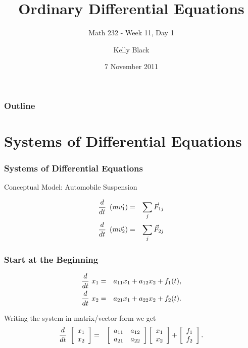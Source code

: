 
\title{Ordinary Differential Equations}
\subtitle{Math 232 - Week 11, Day 1}

\author{Kelly Black}
\date{7 November 2011}

\begin{frame}
  \titlepage
\end{frame}

\begin{frame}
  \frametitle{Outline}
\end{frame}


\section{Systems of Differential Equations}


\begin{frame}
  \frametitle{Systems of Differential Equations}

  Conceptual Model: Automobile Suspension

  \begin{eqnarray*}
    \deriv{~}{t} \lp m \vec{v_1} \rp & = & \sum_j \vec{F}_{1j} \\
    \deriv{~}{t} \lp m \vec{v_2} \rp & = & \sum_j \vec{F}_{2j} 
  \end{eqnarray*}

\end{frame}


\begin{frame}
  \frametitle{Start at the Beginning}

  \begin{eqnarray*}
    \deriv{~}{t} x_1  & = & a_{11} x_1 + a_{12} x_2 + f_1(t), \\
    \deriv{~}{t} x_2  & = & a_{21} x_1 + a_{22} x_2 + f_2(t).
  \end{eqnarray*}

  Writing the system in matrix/vector form we get
  \begin{eqnarray*}
    \deriv{~}{t} \vecTwo{x_1}{x_2} & = & 
    \arrayTwo{a_{11}}{a_{12}}{a_{21}}{a_{22}} \vecTwo{x_1}{x_2} + 
    \vecTwo{f_1}{f_2}.
  \end{eqnarray*}

\end{frame}


